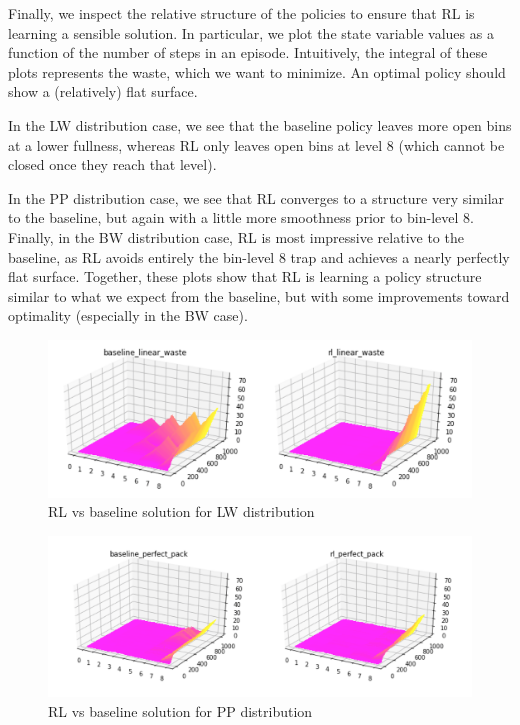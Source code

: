 \documentclass{article}
\begin{document}
Finally, we inspect the relative structure of the policies to ensure that RL is learning a sensible solution.  In particular, we plot the state variable values as a function of the number of steps in an episode. Intuitively, the integral of these plots represents the waste, which we want to minimize.  An optimal policy should show a (relatively) flat surface.

In the LW distribution case, we see that the baseline policy leaves more open bins at a lower fullness, whereas RL only leaves open bins at level 8 (which cannot be closed once they reach that level).

In the PP distribution case, we see that RL converges to a structure very similar to the baseline, but again with a little more smoothness prior to bin-level 8.
Finally, in the BW distribution case, RL is most impressive relative to the baseline, as RL avoids entirely the bin-level 8 trap and achieves a nearly perfectly flat surface.  Together, these plots show that RL is learning a policy structure similar to what we expect from the baseline, but with some improvements toward optimality (especially in the BW case).

\begin{figure}[h!]
	\centering
	\includegraphics[width=1\linewidth]{images/linear_waste_sol.png}
	\caption{RL vs baseline solution for LW distribution}
	\label{fig:bin_packing_LW_dist}
\end{figure}

\begin{figure}[h!]
	\centering
	\includegraphics[width=1\linewidth]{images/perfect_packing_sol.png}
	\caption{RL vs baseline solution for PP distribution}
	\label{fig:bin_packing_BW_dist}
\end{figure}
\end{document}
